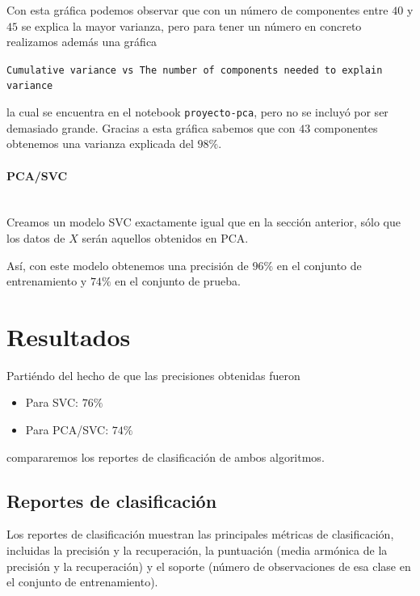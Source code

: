 \documentclass[letterpaper,11pt]{article}
\newcommand{\subsubsubsection}[1]{\paragraph{#1}\mbox{}\\}
\begin{document}
Con esta gráfica podemos observar que con un número de componentes entre $40$ y
$45$ se explica la mayor varianza, pero para tener un número en concreto 
realizamos además una gráfica 
\begin{center}
    \texttt{Cumulative variance vs The number of components needed to explain 
    variance}
\end{center}

la cual se encuentra en el notebook \texttt{proyecto-pca}, pero no se incluyó por 
ser demasiado grande. Gracias a esta gráfica sabemos que con $43$ componentes 
obtenemos una varianza explicada del $98\%$.

\subsubsubsection{PCA/SVC}
Creamos un modelo SVC exactamente igual que en la sección anterior, sólo que 
los datos de $X$ serán aquellos obtenidos en PCA.

Así, con este modelo obtenemos una precisión de $96\%$ en el conjunto de 
entrenamiento y $74\%$ en el conjunto de prueba. 

\newpage
\section{Resultados}

Partiéndo del hecho de que las precisiones obtenidas fueron
\begin{itemize}
    \item Para SVC: $76\%$
    \item Para PCA/SVC: $74\%$
\end{itemize}

compararemos los reportes de clasificación de ambos algoritmos.

\subsection{Reportes de clasificación}

Los reportes de clasificación muestran las principales métricas de clasificación,
incluidas la precisión y la recuperación, la puntuación (media armónica de la
precisión y la recuperación) y el soporte (número de observaciones de esa clase 
en el conjunto de entrenamiento).
\end{document}
